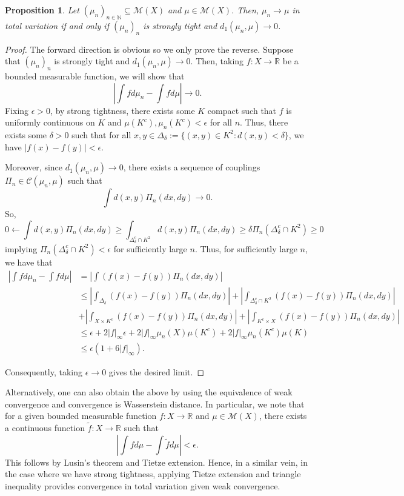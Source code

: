 \documentclass{article}
\newtheorem{proposition}{Proposition}
\begin{document}
\begin{proposition}
Let \((\mu_n)_{n \in \mathbb{N}} \subseteq \mathcal{M}(X)\) and \(\mu \in \mathcal{M}(X)\).
Then, \(\mu_n \to \mu\) in total variation if and only if \((\mu_n)_n\) is strongly tight and \(d_1(\mu_n, \mu) \to 0\).
\end{proposition}

\begin{proof}
The forward direction is obvious so we only prove the reverse. Suppose that \((\mu_n)_n\) is strongly tight
and \(d_1(\mu_n, \mu) \to 0\). Then, taking \(f : X \to \mathbb{R}\) be a bounded measurable function,
we will show that
\[\left|\int f d \mu_n - \int f d \mu\right| \to 0.\]
Fixing \(\epsilon > 0\), by strong tightness, there exists some \(K\) compact such that \(f\) is uniformly continuous on \(K\) and
\(\mu(K^c), \mu_n(K^c) < \epsilon\) for all \(n\). Thus, there exists some \(\delta > 0\) such that
for all \(x, y \in \Delta_\delta := \{(x, y) \in K^2 : d(x, y) < \delta\}\), we have \(|f(x) - f(y)| < \epsilon\).

Moreover, since \(d_1(\mu_n, \mu) \to 0\), there exists a sequence of couplings
\(\Pi_n \in \mathcal{C}(\mu_n, \mu)\) such that
\[\int d(x, y) \Pi_n(d x, d y) \to 0.\]
So,
\[0 \leftarrow \int d(x, y) \Pi_n(d x, d y) \ge \int_{\Delta_\delta^c \cap K^2} d(x, y) \Pi_n(d x, d y)
    \ge \delta \Pi_n(\Delta_\delta^c \cap K^2) \ge 0\]
implying \(\Pi_n(\Delta_\delta^c \cap K^2) < \epsilon\) for sufficiently large \(n\). Thus, for sufficiently large \(n\),
we have that
\begin{align*}
    \left|\int f d \mu_n - \int f d \mu\right|
    & = \left|\int (f(x) - f(y)) \Pi_n(d x, d y)\right|\\
    & \le \left|\int_{\Delta_\delta} (f(x) - f(y)) \Pi_n(d x, d y)\right|
    + \left|\int_{\Delta_\delta^c \cap K^2} (f(x) - f(y)) \Pi_n(d x, d y)\right|\\
    & + \left|\int_{X \times K^c} (f(x) - f(y)) \Pi_n(d x, d y)\right| +
    \left|\int_{K^c \times X} (f(x) - f(y)) \Pi_n(d x, d y)\right|\\
    & \le \epsilon + 2|f|_\infty \epsilon + 2|f|_\infty \mu_n(X)\mu(K^c) + 2|f|_\infty \mu_n(K^c)\mu(K)\\
    & \le \epsilon(1 + 6|f|_\infty).
\end{align*}

Consequently, taking \(\epsilon \to 0\) gives the desired limit.
\end{proof}

Alternatively, one can also obtain the above by using the equivalence of weak convergence and convergence
is Wasserstein distance. In particular,
we note that for a given bounded measurable function \(f : X \to \mathbb{R}\) and \(\mu \in \mathcal{M}(X)\),
there exists a continuous function \(\tilde f : X \to \mathbb{R}\) such that
\[\left| \int f d \mu - \int \tilde f d \mu \right| < \epsilon.\]
This follows by Lusin's theorem and Tietze extension. Hence, in a similar vein, in the case where we have
strong tightness, applying Tietze extension and triangle inequality provides convergence in total variation
given weak convergence.
\end{document}
